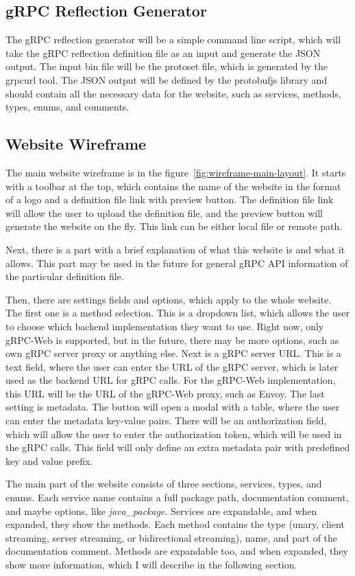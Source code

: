 \subsection{gRPC Reflection Generator}
The gRPC reflection generator will be a simple command line script, which will take the gRPC reflection definition file as an input and generate the JSON output.
The input bin file will be the protoset file, which is generated by the grpcurl tool.
The JSON output will be defined by the protobufjs library and should contain all the necessary data for the website, such as services, methods, types, enums, and comments.

\subsection{Website Wireframe}
The main website wireframe is in the figure~\ref{fig:wireframe-main-layout}.
It starts with a toolbar at the top, which contains the name of the website in the format of a logo and a definition file link with preview button.
The definition file link will allow the user to upload the definition file, and the preview button will generate the website on the fly.
This link can be either local file or remote path.

Next, there is a part with a brief explanation of what this website is and what it allows.
This part may be used in the future for general gRPC API information of the particular definition file.

Then, there are settings fields and options, which apply to the whole website.
The first one is a method selection.
This is a dropdown list, which allows the user to choose which backend implementation they want to use.
Right now, only gRPC-Web is supported, but in the future, there may be more options, such as own gRPC server proxy or anything else.
Next is a gRPC server URL\@.
This is a text field, where the user can enter the URL of the gRPC server, which is later used as the backend URL for gRPC calls.
For the gRPC-Web implementation, this URL will be the URL of the gRPC-Web proxy, such as Envoy.
The last setting is metadata.
The button will open a modal with a table, where the user can enter the metadata key-value pairs.
There will be an authorization field, which will allow the user to enter the authorization token, which will be used in the gRPC calls.
This field will only define an extra metadata pair with predefined key and value prefix.

The main part of the website consists of three sections, services, types, and enums.
Each service name contains a full package path, documentation comment, and maybe options, like \textit{java\_package}.
Services are expandable, and when expanded, they show the methods.
Each method contains the type (unary, client streaming, server streaming, or bidirectional streaming), name, and part of the documentation comment.
Methods are expandable too, and when expanded, they show more information, which I will describe in the following section.

